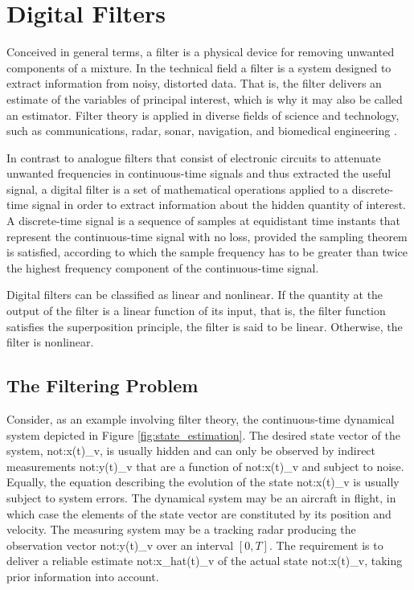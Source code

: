 \chapter{Digital Filters}
\label{ch:digital_filters}

Conceived in general terms, a filter is a physical device for removing unwanted components of a mixture. In the technical field a filter is a system designed to extract information from noisy, distorted data. That is, the filter delivers an estimate of the variables of principal interest, which is why it may also be called an estimator. Filter theory is applied in diverse fields of science and technology, such as communications, radar, sonar, navigation, and biomedical engineering \cite{haykin2002adaptive}.

In contrast to analogue filters that consist of electronic circuits to attenuate unwanted frequencies in continuous-time signals and thus extracted the useful signal, a digital filter is a set of mathematical operations applied to a discrete-time signal in order to extract information about the hidden quantity of interest. A discrete-time signal is a sequence of samples at equidistant time instants that represent the continuous-time signal with no loss, provided the sampling theorem is satisfied, according to which the sample frequency has to be greater than twice the highest frequency component of the continuous-time signal.

Digital filters can be classified as linear and nonlinear. If the quantity at the output of the filter is a linear function of its input, that is, the filter function satisfies the superposition principle, the filter is said to be linear. Otherwise, the filter is nonlinear.

\section{The Filtering Problem}

Consider, as an example involving filter theory, the continuous-time dynamical system depicted in Figure \ref{fig:state_estimation}. The desired state vector of the system, \gls{not:x(t)_v}, is usually hidden and can only be observed by indirect measurements \gls{not:y(t)_v} that are a function of \gls{not:x(t)_v} and subject to noise. Equally, the equation describing the evolution of the state \gls{not:x(t)_v} is usually subject to system errors. The dynamical system may be an aircraft in flight, in which case the elements of the state vector are constituted by its position and velocity. The measuring system may be a tracking radar producing the observation vector \gls{not:y(t)_v} over an interval $[0, T]$. The requirement is to deliver a reliable estimate \gls{not:x_hat(t)_v} of the actual state \gls{not:x(t)_v}, taking prior information into account.

